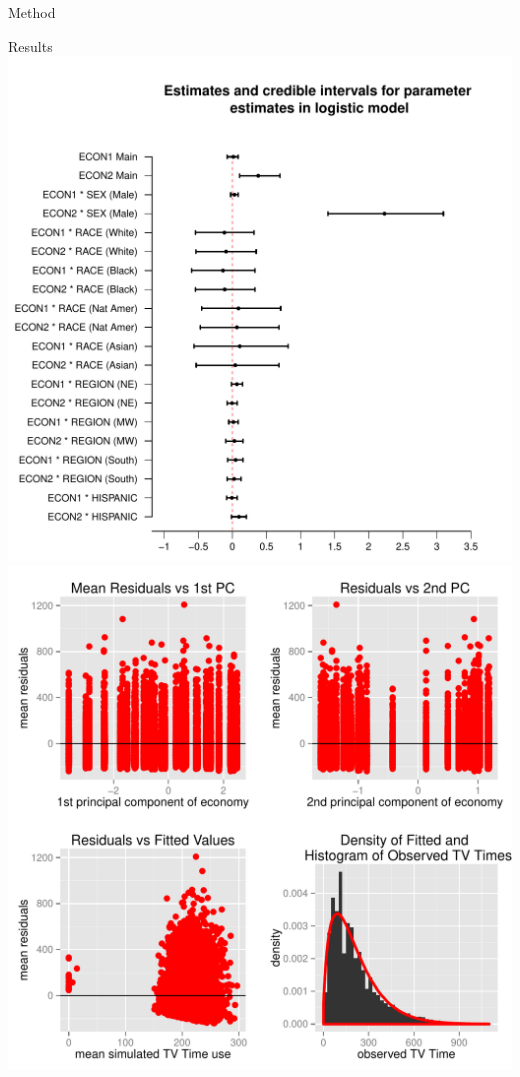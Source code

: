 \documentclass[final]{beamer}
\newcounter{acolumn}%
\def\autoheight{\vspace*{0pt}}%
\begin{document}
\begin{frame}
\begin{acolumns}[t]
\begin{column}{.72\linewidth}
\begin{block}{Method}
     \end{block}
     
     
     \begin{block}{Results}
       \includegraphics{logit_estimates.pdf}   
       \includegraphics{validation.pdf}
      \autoheight 
     \end{block}
     

\end{column}
\end{acolumns}
\end{frame}
\end{document}
